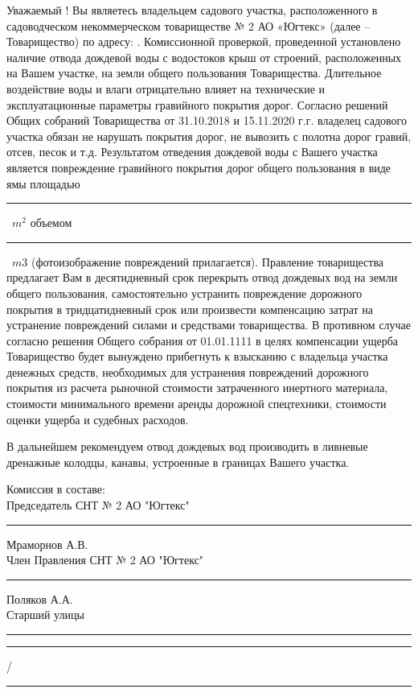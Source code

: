 Уважаемый  ! Вы являетесь владельцем садового участка, расположенного в садоводческом некоммерческом товариществе № 2 АО «Югтекс» (далее – Товарищество) по адресу: .  Комиссионной проверкой, проведенной  установлено наличие  отвода дождевой воды с водостоков крыш от строений, расположенных на Вашем участке, на земли общего пользования Товарищества.  Длительное воздействие воды и влаги отрицательно влияет на технические и эксплуатационные параметры гравийного покрытия дорог.  Согласно решений Общих собраний Товарищества от 31.10.2018 и 15.11.2020 г.г. владелец садового участка обязан не нарушать покрытия дорог, не вывозить с полотна дорог гравий, отсев, песок и т.д.  Результатом отведения дождевой воды с Вашего участка является повреждение гравийного покрытия дорог общего пользования в виде ямы  площадью  \rule{8mm}{0.1 mm}~$m^2$ объемом \rule{8mm}{0.1 mm}~$m3$ (фотоизображение повреждений прилагается).  
Правление товарищества предлагает Вам в десятидневный срок перекрыть отвод дождевых вод на земли общего пользования,  самостоятельно устранить повреждение дорожного покрытия в тридцатидневный срок или произвести компенсацию затрат на устранение повреждений силами и средствами товарищества.  В противном случае согласно решения Общего собрания от 01.01.1111 в целях компенсации ущерба Товарищество  будет вынуждено прибегнуть к взысканию с владельца участка  денежных  средств, необходимых для устранения повреждений дорожного покрытия из расчета рыночной стоимости затраченного инертного материала, стоимости минимального времени аренды дорожной спецтехники, стоимости оценки ущерба и судебных расходов. 

В дальнейшем рекомендуем  отвод  дождевых вод производить в ливневые дренажные колодцы, канавы, устроенные в границах Вашего участка. 

\vspace{3mm}



\vspace{3mm}
\noindent Комиссия в составе:\\

\noindent Председатель СНТ № 2 АО "Югтекс" \hfill    \rule{40mm}{0.1 mm}    Мраморнов А.В.\\[3mm]
\noindent Член Правления СНТ № 2 АО "Югтекс" \hfill    \rule{46mm}{0.1 mm}    Поляков А.А.\\[3mm]
\noindent Старший улицы  \rule{6cm}{0.1 mm} \hfill    \rule{3cm}{0.1 mm}/\rule{4cm}{0.1 mm}\\[3mm]

